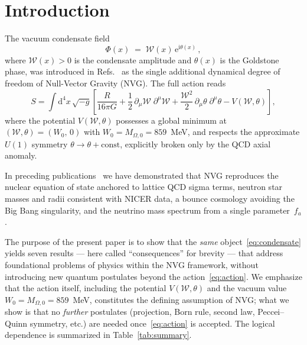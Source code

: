 \documentclass[12pt,a4paper]{article}
\theoremstyle{plain}
\theoremstyle{definition}
\theoremstyle{remark}
\newcommand{\Wc}{\mathcal{W}}
\newcommand{\dd}{\mathrm{d}}
\newcommand{\ee}{\mathrm{e}}
\newcommand{\ii}{\mathrm{i}}
\begin{document}
\vspace{4pt}

\tableofcontents


\section{Introduction}\label{sec:intro}

The vacuum condensate field
\begin{equation}\label{eq:condensate}
  \Phi(x) \;=\; \Wc(x)\,\ee^{\ii\theta(x)}\,,
\end{equation}
where $\Wc(x) > 0$ is the condensate amplitude and $\theta(x)$
is the Goldstone phase, was introduced in
Refs.~\cite{NVG2026dynamics,NVG2026lattice} as the single additional
dynamical degree of freedom of Null-Vector Gravity
(NVG).  The full action reads
\begin{equation}\label{eq:action}
  S = \int\!\dd^4x\,\sqrt{-g}\left[
    \frac{R}{16\pi G}
    + \frac{1}{2}\,\partial_\mu\Wc\;\partial^\mu\Wc
    + \frac{\Wc^2}{2}\,\partial_\mu\theta\;\partial^\mu\theta
    - V(\Wc,\theta)
  \right],
\end{equation}
where the potential $V(\Wc,\theta)$ possesses a global minimum at
$(\Wc,\theta) = (W_0,\,0)$ with $W_0 = M_{\Omega,0} = 859$~MeV,
and respects the approximate $U(1)$ symmetry
$\theta \to \theta + \mathrm{const}$, explicitly broken only by the
QCD axial anomaly.

In preceding publications~\cite{NVG2026dynamics,NVG2026lattice,%
NVG2026cosmology,NVG2026collapse,NVG2026ns} we have demonstrated
that NVG reproduces the nuclear equation of state anchored to
lattice QCD sigma terms, neutron star masses and radii consistent
with NICER data, a bounce cosmology avoiding the Big Bang
singularity, and the neutrino mass spectrum from a single
parameter~$f_a$.

The purpose of the present paper is to show that the
\emph{same} object~\eqref{eq:condensate} yields seven
results — here called ``consequences'' for brevity — that
address foundational problems of physics within the NVG
framework, without introducing new quantum postulates
beyond the action~\eqref{eq:action}.
We emphasize that the action itself, including the
potential $V(\Wc,\theta)$ and the vacuum value
$W_0 = M_{\Omega,0} = 859$~MeV, constitutes the defining assumption
of NVG; what we show is that no \emph{further} postulates
(projection, Born rule, second law, Peccei--Quinn symmetry,
etc.) are needed once~\eqref{eq:action} is accepted.
The logical dependence is
summarized in Table~\ref{tab:summary}.
\end{document}
